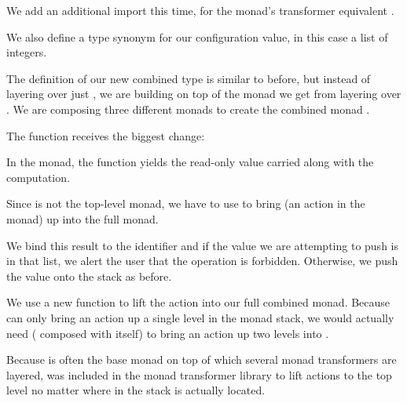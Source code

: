 

\begin{notelist}
    \item We add an additional import this time,  for the 
          monad's transformer equivalent .
    \item We also define a type synonym for our configuration value, in this case a list of integers.
    \item The definition of our new combined type is similar to before, but instead of layering
           over just , we are building on top of the monad we get from 
          layering  over . We are composing three different monads
          to create the combined monad .
    \item The  function receives the biggest change:
        \begin{notelist}
            \item In the  monad, the function  yields the read-only value
                  carried along with the computation.
            \item Since  is not the top-level monad, we have to use  
                  to bring  (an action in the  monad) up into
                  the full  monad.
            \item We bind this result to the identifier  and if the value we are
                  attempting to push is in that list, we alert the user that the operation is
                  forbidden. Otherwise, we push the value onto the stack as before.
            \item We use a new function  to lift the  action into our
                  full combined monad. Because  can only bring an action up
                  a single level in the monad stack, we would actually need 
                  ( composed with itself) to bring an  action up
                  two levels into .
            \item Because  is often the base monad on top of which several monad
                  transformers are layered,  was included in the monad transformer
                  library to lift  actions to the top level no matter where in the 
                  stack  is actually located.
        \end{notelist}
\end{notelist}

